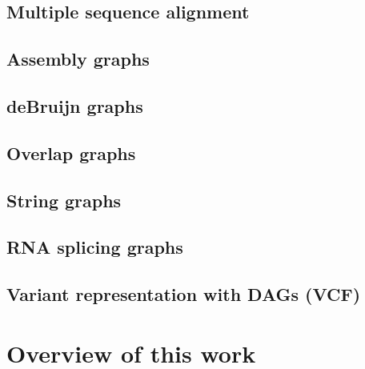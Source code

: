 \subsection{Multiple sequence alignment}

\subsection{Assembly graphs}

\subsection{deBruijn graphs}

\subsection{Overlap graphs}

\subsection{String graphs}

\subsection{RNA splicing graphs}

\subsection{Variant representation with DAGs (VCF)}

\section{Overview of this work}

